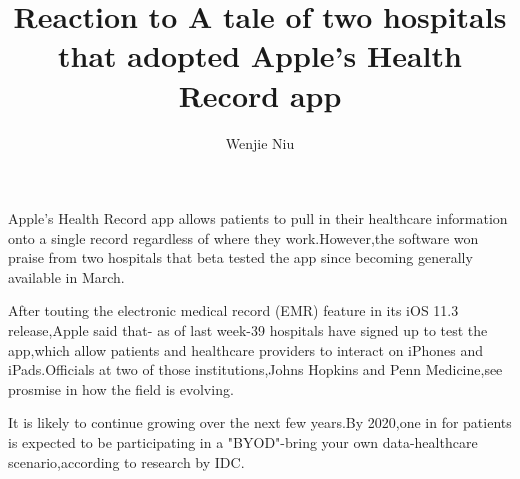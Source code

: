 \documentclass{article}
\author{Wenjie Niu}
\title{Reaction to A tale of two hospitals that adopted Apple’s Health Record app}
\begin{document}
\maketitle
Apple's Health Record app allows patients to pull in their healthcare information onto  a single record regardless of where they work.However,the software won praise from two hospitals that beta tested the app since becoming generally available in March.


After touting the electronic medical record (EMR) feature in its iOS 11.3 release,Apple said that- as of last week-39 hospitals have signed up to test the app,which allow patients and healthcare providers to interact on iPhones and iPads.Officials at two of those institutions,Johns Hopkins and Penn Medicine,see prosmise in how  the field is evolving.

It is likely to continue growing over the next few years.By 2020,one in for patients is expected to be participating in a "BYOD"-bring your own data-healthcare scenario,according to research by IDC.
\end{document}
